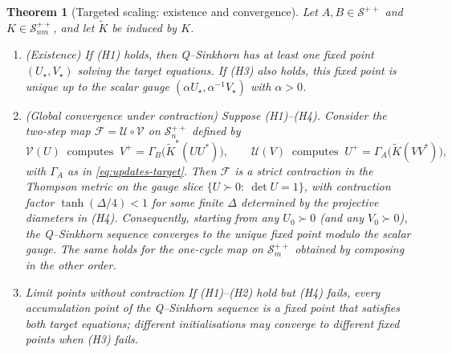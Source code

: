 \documentclass[10pt]{article}
\newcommand{\Ss}{\mathcal{S}}
\newcommand{\Ko}{\widetilde{K}}
\theoremstyle{plain}
\newtheorem{thm}{Theorem}
\theoremstyle{definition}
\theoremstyle{remark}
\begin{document}
\begin{thm}[Targeted scaling: existence and convergence]\label{thm:target-scaling}
Let $A,B\in\Ss^{++}$ and $K\in\Ss_{nm}^{++}$, and let $\Ko$ be induced by $K$.
\begin{enumerate}
\item \emph{(Existence)} If \emph{(H1)} holds, then Q--Sinkhorn has at least one fixed point $(U_\star,V_\star)$ solving the target equations. If \emph{(H3)} also holds, this fixed point is unique up to the scalar gauge $(\alpha U_\star,\alpha^{-1}V_\star)$ with $\alpha>0$.
\item \emph{(Global convergence under contraction)} Suppose \emph{(H1)}--\emph{(H4)}.  
Consider the two-step map $\mathcal{F}=\mathcal{U}\circ\mathcal{V}$ on $\Ss_n^{++}$ defined by
\[
\mathcal{V}(U)\ \text{ computes }\ V^+=\Gamma_B\!\big(\Ko^\ast(UU^\ast)\big),\qquad
\mathcal{U}(V)\ \text{ computes }\ U^+=\Gamma_A\!\big(\Ko(VV^\ast)\big),
\]
with $\Gamma_A$ as in \eqref{eq:updates-target}.  
Then $\mathcal{F}$ is a strict contraction in the Thompson metric on the gauge slice $\{U\succ0:\ \det U=1\}$, with contraction factor $\tanh(\Delta/4)<1$ for some finite $\Delta$ determined by the projective diameters in \emph{(H4)}. Consequently, starting from any $U_0\succ0$ (and any $V_0\succ0$), the Q--Sinkhorn sequence converges to the unique fixed point modulo the scalar gauge. The same holds for the one-cycle map on $\Ss_m^{++}$ obtained by composing in the other order.
\item \emph{Limit points without contraction} If \emph{(H1)}--\emph{(H2)} hold but \emph{(H4)} fails, every accumulation point of the Q--Sinkhorn sequence is a fixed point that satisfies both target equations; different initialisations may converge to different fixed points when \emph{(H3)} fails.
\end{enumerate}
\end{thm}
\end{document}
